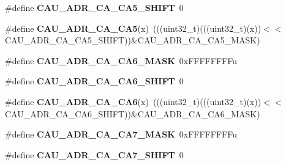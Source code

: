 \begin{DoxyCompactItemize}
\item 
\#define {\bfseries C\+A\+U\+\_\+\+A\+D\+R\+\_\+\+C\+A\+\_\+\+C\+A5\+\_\+\+S\+H\+I\+FT}~0\hypertarget{group__CAU__Register__Masks_ga172ed7376ee2f81527fc39ed02ac8925}{}\label{group__CAU__Register__Masks_ga172ed7376ee2f81527fc39ed02ac8925}

\item 
\#define {\bfseries C\+A\+U\+\_\+\+A\+D\+R\+\_\+\+C\+A\+\_\+\+C\+A5}(x)~(((uint32\+\_\+t)(((uint32\+\_\+t)(x))$<$$<$C\+A\+U\+\_\+\+A\+D\+R\+\_\+\+C\+A\+\_\+\+C\+A5\+\_\+\+S\+H\+I\+FT))\&C\+A\+U\+\_\+\+A\+D\+R\+\_\+\+C\+A\+\_\+\+C\+A5\+\_\+\+M\+A\+SK)\hypertarget{group__CAU__Register__Masks_ga6ae6602ea7315196a1bc280b23243325}{}\label{group__CAU__Register__Masks_ga6ae6602ea7315196a1bc280b23243325}

\item 
\#define {\bfseries C\+A\+U\+\_\+\+A\+D\+R\+\_\+\+C\+A\+\_\+\+C\+A6\+\_\+\+M\+A\+SK}~0x\+F\+F\+F\+F\+F\+F\+F\+Fu\hypertarget{group__CAU__Register__Masks_gaadd7000eac5326b13aa96c5823005731}{}\label{group__CAU__Register__Masks_gaadd7000eac5326b13aa96c5823005731}

\item 
\#define {\bfseries C\+A\+U\+\_\+\+A\+D\+R\+\_\+\+C\+A\+\_\+\+C\+A6\+\_\+\+S\+H\+I\+FT}~0\hypertarget{group__CAU__Register__Masks_gad8dbe87fc33b130d08642de3a23246a2}{}\label{group__CAU__Register__Masks_gad8dbe87fc33b130d08642de3a23246a2}

\item 
\#define {\bfseries C\+A\+U\+\_\+\+A\+D\+R\+\_\+\+C\+A\+\_\+\+C\+A6}(x)~(((uint32\+\_\+t)(((uint32\+\_\+t)(x))$<$$<$C\+A\+U\+\_\+\+A\+D\+R\+\_\+\+C\+A\+\_\+\+C\+A6\+\_\+\+S\+H\+I\+FT))\&C\+A\+U\+\_\+\+A\+D\+R\+\_\+\+C\+A\+\_\+\+C\+A6\+\_\+\+M\+A\+SK)\hypertarget{group__CAU__Register__Masks_ga51577142dfe928002db306968d2d04c4}{}\label{group__CAU__Register__Masks_ga51577142dfe928002db306968d2d04c4}

\item 
\#define {\bfseries C\+A\+U\+\_\+\+A\+D\+R\+\_\+\+C\+A\+\_\+\+C\+A7\+\_\+\+M\+A\+SK}~0x\+F\+F\+F\+F\+F\+F\+F\+Fu\hypertarget{group__CAU__Register__Masks_ga2ea865f0bce0752907d3cf74be39c6fc}{}\label{group__CAU__Register__Masks_ga2ea865f0bce0752907d3cf74be39c6fc}

\item 
\#define {\bfseries C\+A\+U\+\_\+\+A\+D\+R\+\_\+\+C\+A\+\_\+\+C\+A7\+\_\+\+S\+H\+I\+FT}~0\hypertarget{group__CAU__Register__Masks_ga8bee4c551567070e18a1ed1cc5898e8f}{}\label{group__CAU__Register__Masks_ga8bee4c551567070e18a1ed1cc5898e8f}


\end{DoxyCompactItemize}

